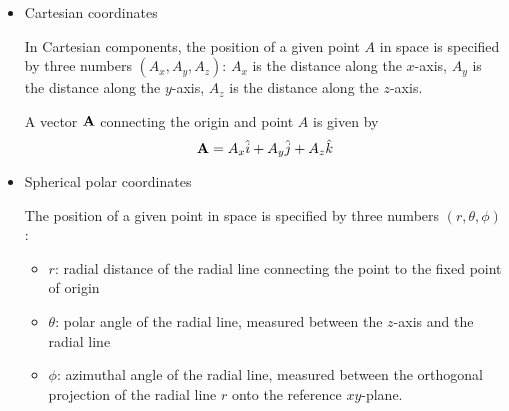 \documentclass[12pt,a4 paper]{extreport}
\begin{document}
\begin{itemize}
\item Cartesian coordinates

In Cartesian components, the position of a given point $A$ in space is specified by three numbers $(A_x,A_y,A_z)$: $A_x$ is the distance along the $x$-axis, $A_y$ is the distance along the $y$-axis, $A_z$ is the distance along the $z$-axis.

A vector $\vb{A}$ connecting the origin and point $A$ is given by
\[ \vb{A} = A_x\hat{i}+A_y\hat{j}+A_z\hat{k} \]

\item Spherical polar coordinates

The position of a given point in space is specified by three numbers $(r,\theta,\phi)$:
\begin{itemize}
\item $r$: radial distance of the radial line connecting the point to the fixed point of origin
\item $\theta$: polar angle of the radial line, measured between the $z$-axis and the radial line
\item $\phi$: azimuthal angle of the radial line, measured between the orthogonal projection of the radial line $r$ onto the reference $xy$-plane.
\end{itemize}
\end{itemize}










\end{document}
